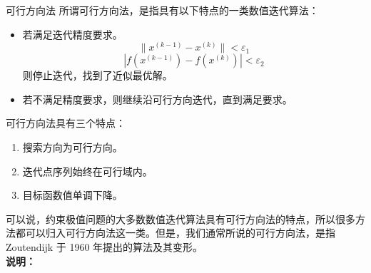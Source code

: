 \begin{dfnbox}{可行方向法}{}
    所谓可行方向法，是指具有以下特点的一类数值迭代算法：
    \begin{itemize}
        \item 若满足迭代精度要求。
        \[
        \|x^{(k-1)} - x^{(k)}\| < \varepsilon_1
        \]
        \[
        |f(x^{(k-1)}) - f(x^{(k)})| < \varepsilon_2
        \]
        则停止迭代，找到了近似最优解。
        
        \item 若不满足精度要求，则继续沿可行方向迭代，直到满足要求。
    \end{itemize}
\end{dfnbox}
可行方向法具有三个特点：
    \begin{enumerate}
        \item 搜索方向为可行方向。
        \item 迭代点序列始终在可行域内。
        \item 目标函数值单调下降。
    \end{enumerate}
可以说，约束极值问题的大多数数值迭代算法具有可行方向法的特点，所以很多方法都可以归入可行方向法这一类。但是，我们通常所说的可行方向法，是指 Zoutendijk 于 1960 年提出的算法及其变形。
\\\textbf{说明：}
    
